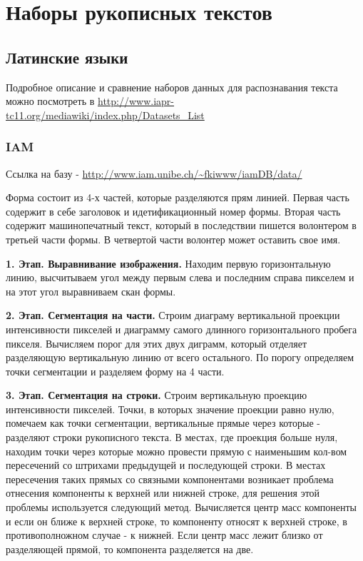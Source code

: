 \chapter{Наборы рукописных текстов}
\section{Латинские языки}

Подробное описание и сравнение наборов данных для распознавания текста можно посмотреть в \cite{hussain2015comprehensive} \url{http://www.iapr-tc11.org/mediawiki/index.php/Datasets_List}

\subsection{IAM}
Ссылка на базу - \url{http://www.iam.unibe.ch/~fkiwww/iamDB/data/}

Форма состоит из 4-х частей, которые разделяются прям линией. Первая часть содержит в себе заголовок и идетификационный номер формы. Вторая часть содержит машинопечатный текст, который в последствии пишется волонтером в третьей части формы. В четвертой части волонтер может оставить свое имя. 

\textbf{1. Этап. Выравнивание изображения.} Находим первую горизонтальную линию, высчитываем угол между первым слева и последним справа пикселем и на этот угол выравниваем скан формы.

\textbf{2. Этап. Сегментация на части.} Строим диаграму вертикальной проекции интенсивности пикселей и диаграмму самого длинного горизонтального пробега пикселя. Вычисляем порог для этих двух диграмм, который отделяет разделяющую вертикальную линию от всего остального. По порогу определяем точки сегментации и разделяем форму на 4 части.

 \textbf{3. Этап. Сегментация на строки.} Строим вертикальную проекцию интенсивности пикселей. Точки, в которых значение проекции равно нулю, помечаем как точки сегментации, вертикальные прямые через которые - разделяют строки рукописного текста. В местах, где проекция больше нуля, находим точки через которые можно провести прямую с наименьшим кол-вом пересечений со штрихами предыдущей и последующей строки. В местах пересечения таких прямых со связными компонентами возникает проблема отнесения компоненты к верхней или нижней строке, для решения этой проблемы используется следующий метод. Вычисляется центр масс компоненты и если он ближе к верхней строке, то компоненту относят к верхней строке, в противополножном случае - к нижней. Если центр масс лежит близко от разделяющей прямой, то компонента разделяется на две. 

